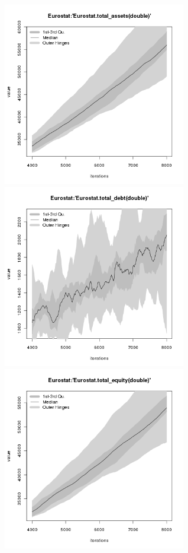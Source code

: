 \begin{figure}[H!]
\centering\leavevmode
\begin{minipage}{17cm}
\centering\leavevmode
\includegraphics[width=8cm]{./png/tax_0.05/Eurostat-total_assets.png}
\includegraphics[width=8cm]{./png/tax_0.05/Eurostat-total_debt.png}\\
\includegraphics[width=8cm]{./png/tax_0.05/Eurostat-total_equity.png}

\end{minipage}
\end{figure}

